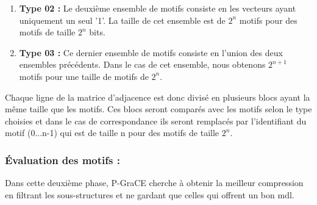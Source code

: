 \documentclass[a4paper,oneside,12pt]{report}
\theoremstyle{definition}
\begin{document}
\begin{enumerate}
\begin{enumerate}[label=(\alph*)]
		
		
		\item \textbf{Type 02 :} Le deuxième ensemble de motifs consiste en les vecteurs ayant uniquement un seul '1'. La taille de cet ensemble est de $2^n$ motifs pour des motifs de taille $2^n$ bits.
		\item \textbf{Type 03 :}  Ce dernier ensemble de motifs consiste en l'union des deux ensembles précédents. Dans le cas de cet ensemble, nous obtenons $2^{n+1}$ motifs pour une taille de motifs de $2^n$.
	\end{enumerate}	

Chaque ligne de la matrice d'adjacence est donc divisé en plusieurs blocs ayant la même taille que les motifs. Ces blocs seront comparés avec les motifs selon le type choisies et dans le cas de correspondance ils seront remplacés par l'identifiant du motif (0...n-1) qui est de taille n pour des motifs de taille $2^n$.


	
\end{enumerate}
		
		\subsubsection{Évaluation des motifs :}
		
		 Dans cette deuxième phase, P-GraCE cherche à obtenir la meilleur compression en filtrant les sous-structures et ne gardant que celles qui offrent un bon \gls{mdl}. 
		 
\end{document}
